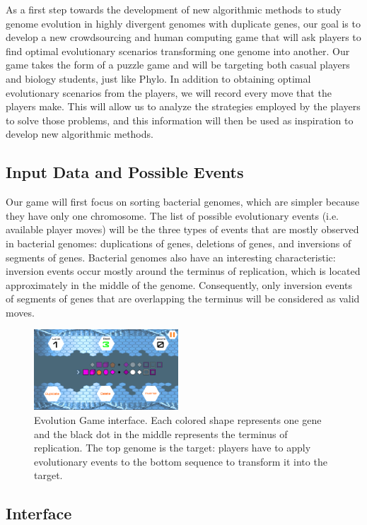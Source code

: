 \documentclass{article}
\begin{document}
As a first step towards the development of new algorithmic methods to study genome evolution in highly divergent genomes with duplicate genes, our goal is to develop a new crowdsourcing and human computing game that will ask players to find optimal evolutionary scenarios transforming one genome into another. Our game takes the form of a puzzle game and will be targeting both casual players and biology students, just like Phylo. In addition to obtaining optimal evolutionary scenarios from the players, we will record every move that the players make. This will allow us to analyze the strategies employed by the players to solve those problems, and this information will then be used as inspiration to develop new algorithmic methods.

\subsection{Input Data and Possible Events}

Our game will first focus on sorting bacterial genomes, which are simpler because they have only one chromosome. 
The list of possible evolutionary events (i.e. available player moves) will be the three types of events that are mostly observed in bacterial genomes: duplications of genes, deletions of genes, and inversions of segments of genes. Bacterial genomes also have an interesting characteristic: inversion events occur mostly around the terminus of replication, which is located approximately in the middle of the genome. Consequently, only inversion events of segments of genes that are overlapping the terminus will be considered as valid moves.

\begin{figure}
 \centering
  \includegraphics[width=0.48\textwidth]{EvoGame.png}
 \caption{Evolution Game interface. Each colored shape represents one gene and the black dot in the middle represents the terminus of replication. The top genome is the target: players have to apply evolutionary events to the bottom sequence to transform it into the target.}
 \label{fig:2}
\end{figure}
\subsection{Interface}
\end{document}
